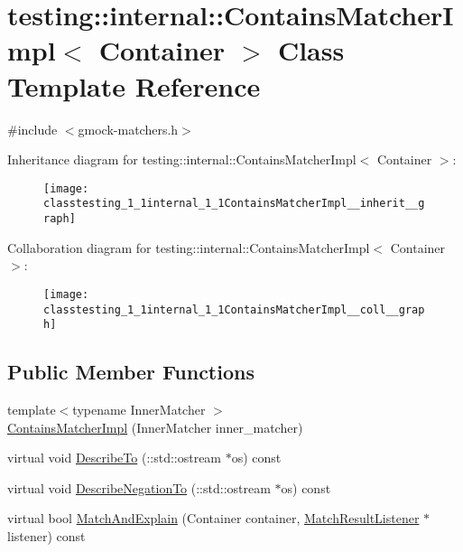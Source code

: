 \hypertarget{classtesting_1_1internal_1_1ContainsMatcherImpl}{}\section{testing\+:\+:internal\+:\+:Contains\+Matcher\+Impl$<$ Container $>$ Class Template Reference}
\label{classtesting_1_1internal_1_1ContainsMatcherImpl}


{\ttfamily \#include $<$gmock-\/matchers.\+h$>$}



Inheritance diagram for testing\+:\+:internal\+:\+:Contains\+Matcher\+Impl$<$ Container $>$\+:\nopagebreak
\begin{figure}[H]
\begin{center}
\leavevmode
\texttt{[image: classtesting\_1\_1internal\_1\_1ContainsMatcherImpl\_\_inherit\_\_graph]}
\end{center}
\end{figure}


Collaboration diagram for testing\+:\+:internal\+:\+:Contains\+Matcher\+Impl$<$ Container $>$\+:\nopagebreak
\begin{figure}[H]
\begin{center}
\leavevmode
\texttt{[image: classtesting\_1\_1internal\_1\_1ContainsMatcherImpl\_\_coll\_\_graph]}
\end{center}
\end{figure}
\subsection*{Public Member Functions}
\begin{DoxyCompactItemize}
\item 
{\footnotesize template$<$typename Inner\+Matcher $>$ }\\\hyperlink{classtesting_1_1internal_1_1ContainsMatcherImpl_a3fd56f21081068101a76ebe05fc1d7f4}{Contains\+Matcher\+Impl} (Inner\+Matcher inner\+\_\+matcher)
\item 
virtual void \hyperlink{classtesting_1_1internal_1_1ContainsMatcherImpl_a8fa3ebe5a6ba6ccc21c6f9aa6c6bbdb9}{Describe\+To} (\+::std\+::ostream $\ast$os) const 
\item 
virtual void \hyperlink{classtesting_1_1internal_1_1ContainsMatcherImpl_aa8448326064567a1c61ef027a241459c}{Describe\+Negation\+To} (\+::std\+::ostream $\ast$os) const 
\item 
virtual bool \hyperlink{classtesting_1_1internal_1_1ContainsMatcherImpl_aa70ab361eb1d4f2aa01d2cee3ef4cb25}{Match\+And\+Explain} (Container container, \hyperlink{classtesting_1_1MatchResultListener}{Match\+Result\+Listener} $\ast$listener) const 
\end{DoxyCompactItemize}

